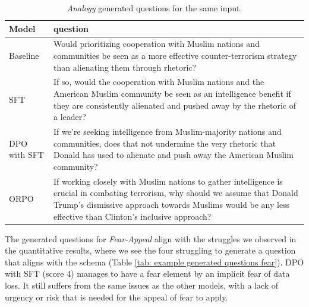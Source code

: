 \documentclass[11pt]{article}
\begin{document}
\begin{table} [H]
    \centering
    \begin{tabular}{p{1.4cm}p{5.5cm}}
    \hline
    \textbf{Model} & \textbf{question}\\
    \hline
     Baseline & Would prioritizing cooperation with Muslim nations and communities be seen as a more effective counter-terrorism strategy than alienating them through rhetoric?\\
     SFT & If so, would the cooperation with Muslim nations and the American Muslim community be seen as an intelligence benefit if they are consistently alienated and pushed away by the rhetoric of a leader?\\
     DPO with SFT & If we're seeking intelligence from Muslim-majority nations and communities, does that not undermine the very rhetoric that Donald has used to alienate and push away the American Muslim community?\\
     ORPO & If working closely with Muslim nations to gather intelligence is crucial in combating terrorism, why should we assume that Donald Trump's dismissive approach towards Muslims would be any less effective than Clinton's inclusive approach? \\
    \end{tabular}
    \caption{\textit{Analogy} generated questions for the same input.}
    \label{tab: example generated questions analogy}
\end{table}

The generated questions for \textit{Fear-Appeal} align with the struggles we observed in the quantitative results, where we see the four struggling to generate a question that aligns with the schema (Table \ref{tab: example generated questions fear}). DPO with SFT (score 4) manages to have a fear element by an implicit fear of data loss. It still suffers from the same issues as the other models, with a lack of urgency or risk that is needed for the appeal of fear to apply.
\end{document}
